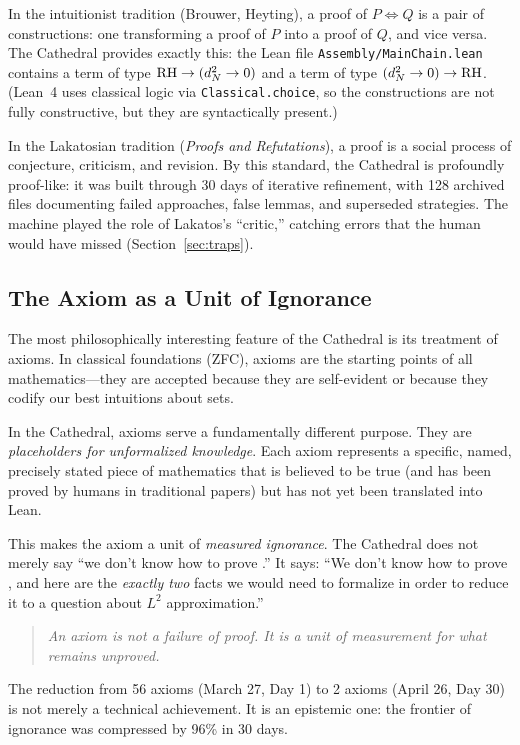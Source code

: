\documentclass[11pt,a4paper]{article}
\begin{document}
In the intuitionist tradition (Brouwer, Heyting), a proof of $P \iff Q$
is a pair of constructions: one transforming a proof of $P$ into a
proof of $Q$, and vice versa. The Cathedral provides exactly this:
the Lean file \texttt{Assembly/MainChain.lean} contains a term of
type $\mathrm{RH} \to (d_N^2 \to 0)$ and a term of type
$(d_N^2 \to 0) \to \mathrm{RH}$. (Lean~4 uses classical logic via
\texttt{Classical.choice}, so the constructions are not fully
constructive, but they are syntactically present.)

In the Lakatosian tradition (\emph{Proofs and Refutations}), a proof
is a social process of conjecture, criticism, and revision. By this
standard, the Cathedral is profoundly proof-like: it was built through
30 days of iterative refinement, with 128 archived files documenting
failed approaches, false lemmas, and superseded strategies. The
machine played the role of Lakatos's ``critic,'' catching errors that
the human would have missed (Section~\ref{sec:traps}).

\subsection{The Axiom as a Unit of Ignorance}

The most philosophically interesting feature of the Cathedral is its
treatment of axioms. In classical foundations (ZFC), axioms are the
starting points of all mathematics---they are accepted because they
are self-evident or because they codify our best intuitions about
sets.

In the Cathedral, axioms serve a fundamentally different purpose. They
are \emph{placeholders for unformalized knowledge}. Each axiom
represents a specific, named, precisely stated piece of mathematics
that is believed to be true (and has been proved by humans in
traditional papers) but has not yet been translated into Lean.

This makes the axiom a unit of \emph{measured ignorance}. The
Cathedral does not merely say ``we don't know how to prove \RH.''
It says: ``We don't know how to prove \RH, and here are the
\emph{exactly two} facts we would need to formalize in order to
reduce it to a question about $L^2$ approximation.''

\begin{quote}
\emph{An axiom is not a failure of proof. It is a unit of measurement
for what remains unproved.}
\end{quote}

The reduction from 56 axioms (March 27, Day 1) to 2 axioms (April 26,
Day 30) is not merely a technical achievement. It is an epistemic
one: the frontier of ignorance was compressed by 96\% in 30 days.
\end{document}
